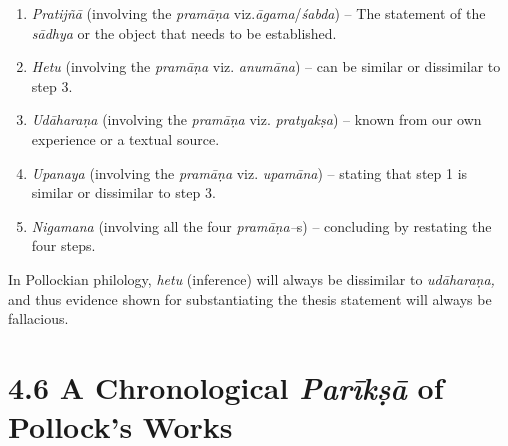 \begin{enumerate}
\itemsep=0pt
\item \textit{Pratijñā} (involving the \textit{pramāṇa} viz.\textit{āgama}/\textit{śabda}) – The statement of the \textit{sādhya }or the object that needs to be established.

 \item \textit{Hetu} (involving the \textit{pramāṇa }viz.\textit{ anumāna}) – can be similar or dissimilar to step 3.

 \item \textit{Udāharaṇa} (involving the \textit{pramāṇa }viz.\textit{ pratyakṣa}) – known from our own experience or a textual source.

 \item \textit{Upanaya} (involving the \textit{pramāṇa }viz.\textit{ upamāna}) – stating that step 1 is similar or dissimilar to step 3.

 \item \textit{Nigamana} (involving all the four \textit{pramāṇa–}s) – concluding by restating the four steps.

\end{enumerate}

\vspace{-.3cm}

In Pollockian philology, \textit{hetu} (inference) will always be dissimilar to \textit{udāharaṇa,} and thus evidence shown for substantiating the thesis statement will always be fallacious.

\vspace{-.3cm}

\section*{4.6 A Chronological {\it {\bfseries Parīkṣā}} of Pollock’s Works}

\vspace{-.2cm}

